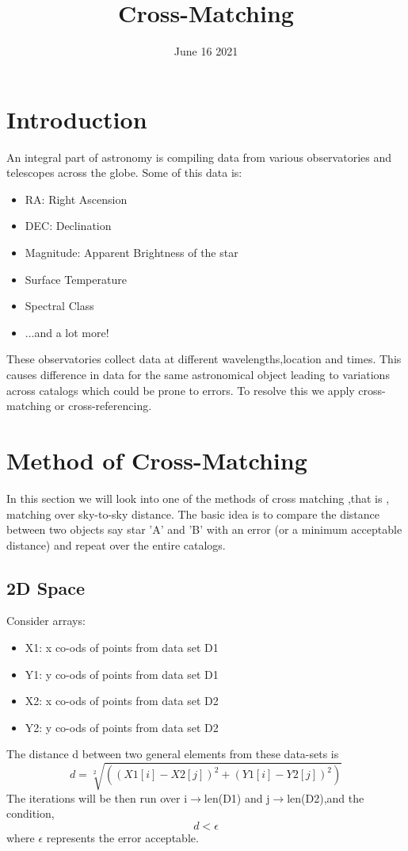 \documentclass{article}
\title{Cross-Matching}
\date{June 16 2021}
\begin{document}
\maketitle

\section{Introduction}
An integral part of astronomy is compiling data from various observatories and telescopes across the globe.
Some of this data is:
        \begin{itemize}
            \item RA:        Right Ascension 
            \item DEC:       Declination
            \item Magnitude: Apparent Brightness of the star
            \item Surface Temperature
            \item Spectral Class
            \item ...and a lot more!
        \end{itemize}
These observatories collect data at different wavelengths,location and times.
This causes difference in data for the same astronomical object leading to variations across catalogs which could be prone to errors.
To resolve this we apply cross-matching or cross-referencing.

\section{Method of Cross-Matching}
In this section we will look into one of the methods of cross matching ,that is , matching over sky-to-sky distance.
The basic idea is to compare the distance between two objects say star 'A' and 'B' with an error (or a minimum acceptable distance) and repeat over the entire catalogs.
    \subsection{2D Space}
    Consider arrays:
        \begin{itemize}
            \item X1: x co-ods of points from data set D1
            \item Y1: y co-ods of points from data set D1
            \item X2: x co-ods of points from data set D2
            \item Y2: y co-ods of points from data set D2
        \end{itemize}
    The distance d between two general elements from these data-sets is
                    \[d=\sqrt[2]{((X1[i]-X2[j])^2+(Y1[i]-Y2[j])^2)}\]
    The iterations will be then run over i\(\rightarrow\)len(D1) and j\(\rightarrow\)len(D2),and the condition, \[d<\epsilon\] where \(\epsilon\) represents the error acceptable.
    
\end{document}
